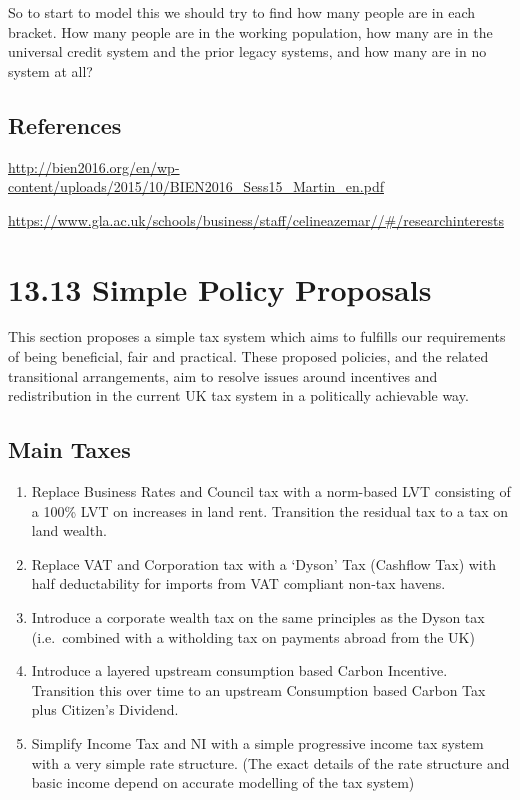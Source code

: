 \documentclass[]{tufte-handout}
\providecommand{\tightlist}{%
  \setlength{\itemsep}{0pt}\setlength{\parskip}{0pt}}
\begin{document}
So to start to model this we should try to find how many people are in
each bracket. How many people are in the working population, how many
are in the universal credit system and the prior legacy systems, and how
many are in no system at all?

\hypertarget{references}{%
\subsection{References}\label{references}}

\url{http://bien2016.org/en/wp-content/uploads/2015/10/BIEN2016_Sess15_Martin_en.pdf}

\url{https://www.gla.ac.uk/schools/business/staff/celineazemar//\#/researchinterests}

\hypertarget{simple-policy-proposals}{%
\section{13.13 Simple Policy Proposals}\label{simple-policy-proposals}}

This section proposes a simple tax system which aims to fulfills our
requirements of being beneficial, fair and practical. These proposed
policies, and the related transitional arrangements, aim to resolve
issues around incentives and redistribution in the current UK tax system
in a politically achievable way.

\hypertarget{main-taxes}{%
\subsection{Main Taxes}\label{main-taxes}}

\begin{enumerate}
\def\labelenumi{\arabic{enumi}.}
\tightlist
\item
  Replace Business Rates and Council tax with a norm-based LVT
  consisting of a 100\% LVT on increases in land rent. Transition the
  residual tax to a tax on land wealth.
\item
  Replace VAT and Corporation tax with a `Dyson' Tax (Cashflow Tax) with
  half deductability for imports from VAT compliant non-tax havens.\\
\item
  Introduce a corporate wealth tax on the same principles as the Dyson
  tax (i.e.~combined with a witholding tax on payments abroad from the
  UK)
\item
  Introduce a layered upstream consumption based Carbon Incentive.
  Transition this over time to an upstream Consumption based Carbon Tax
  plus Citizen's Dividend.
\item
  Simplify Income Tax and NI with a simple progressive income tax system
  with a very simple rate structure. (The exact details of the rate
  structure and basic income depend on accurate modelling of the tax
  system)
\end{enumerate}
\end{document}
